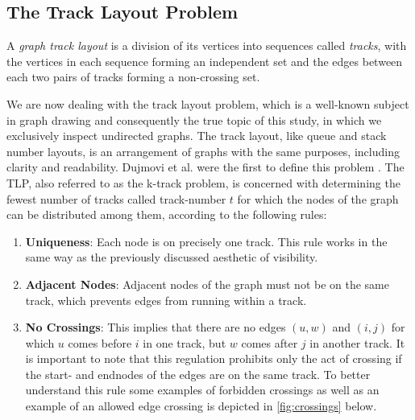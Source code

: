 \documentclass[bachelor, english]{algothesis}
\begin{document}
\subsection{The Track Layout Problem}
    \label{chap:track}
\begin{definition}
    A \emph{graph track layout} is a division of its vertices into sequences called \emph{tracks}, with the vertices in each sequence forming an independent set and the edges between each two pairs of tracks forming a non-crossing set.
\end{definition}
\noindent
We are now dealing with the track layout problem, which is a well-known subject in graph drawing and consequently the true topic of this study, in which we exclusively inspect undirected graphs. The track layout, like queue and stack number layouts, is an arrangement of graphs with the same purposes, including clarity and readability. Dujmovi et al. were the first to define this problem \cite{track_layout}. The TLP, also referred to as the k-track problem, is concerned with determining the fewest number of tracks called track-number $t$ for which the nodes of the graph can be distributed among them, according to the following rules:
\begin{enumerate}
    \item \textbf{Uniqueness}: Each node is on precisely one track.
    This rule works in the same way as the previously discussed aesthetic of visibility.
    \item \textbf{Adjacent Nodes}: Adjacent nodes of the graph must not be on the same track, which prevents edges from running within a track.
    \item \textbf{No Crossings}: This implies that there are no edges $(u,w)$ and $(i,j)$ for which $u$ comes before $i$ in one track, but $w$ comes after $j$ in another track. It is important to note that this regulation prohibits only the act of crossing if the start- and endnodes of the edges are on the same track. To better understand this rule some examples of forbidden crossings as well as an example of an allowed edge crossing is depicted in \cref{fig:crossings} below.
\end{enumerate}
\end{document}
